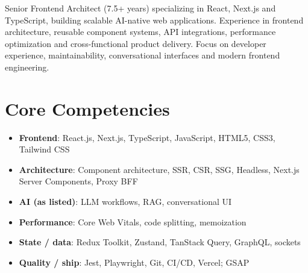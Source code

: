 \documentclass[11pt,a4paper,sans]{moderncv}
\begin{document}
\makecvtitle

\vspace{6pt}
\small{Senior Frontend Architect (7.5+ years) specializing in React, Next.js and TypeScript, building scalable AI-native web applications. Experience in frontend architecture, reusable component systems, API integrations, performance optimization and cross-functional product delivery. Focus on developer experience, maintainability, conversational interfaces and modern frontend engineering.}

\section{Core Competencies}
\vspace{1pt}
\begin{itemize}
\item \textbf{Frontend}: React.js, Next.js, TypeScript, JavaScript, HTML5, CSS3, Tailwind CSS
\item \textbf{Architecture}: Component architecture, SSR, CSR, SSG, Headless, Next.js Server Components, Proxy BFF
\item \textbf{AI (as listed)}: LLM workflows, RAG, conversational UI
\item \textbf{Performance}: Core Web Vitals, code splitting, memoization
\item \textbf{State / data}: Redux Toolkit, Zustand, TanStack Query, GraphQL, sockets
\item \textbf{Quality / ship}: Jest, Playwright, Git, CI/CD, Vercel; GSAP
\end{itemize}
\end{document}

